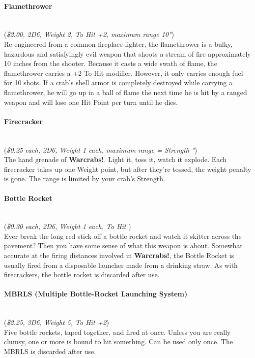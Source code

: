 \documentclass[a4paper,10pt]{article}
\newcommand{\warcrabs}{\textbf{Warcrabs!}}
\begin{document}
\paragraph*{Flamethrower}
\label{sec:Flamethrower}
\hspace*{0px}\\(\textit{\$2.00, 2D6, Weight 2, To Hit +2, maximum range 10"})\\
Re-engineered from a common fireplace lighter, the flamethrower is a bulky, hazardous and satisfyingly evil weapon that shoots a stream of fire approximately 10 inches from the shooter. Because it casts a wide swath of flame, the flamethrower carries a +2 To Hit modifier. However, it only carries enough fuel for 10 shots. If a crab's shell armor is completely destroyed while carrying a flamethrower, he will go up in a ball of flame the next time he is hit by a ranged weapon and will lose one Hit Point per turn until he dies.

\paragraph*{Firecracker}
\label{sec:Firecracker}
\hspace*{0px}\\(\textit{\$0.25 each, 2D6, Weight 1 each, maximum range = Strength "})\\
The hand grenade of \warcrabs. Light it, toss it, watch it explode. Each firecracker takes up one Weight point, but after they're tossed, the weight penalty is gone. The range is limited by your crab's Strength.

\paragraph*{Bottle Rocket}
\label{sec:BottleRocket}
\hspace*{0px}\\(\textit{\$0.30 each, 2D6, Weight 1 each, To Hit })\\
Ever break the long red stick off a bottle rocket and watch it skitter across the pavement? Then you have some sense of what this weapon is about. Somewhat accurate at the firing distances involved in \warcrabs, the Bottle Rocket is usually fired from a disposable launcher made from a drinking straw. As with firecrackers, the bottle rocket is discarded after use.

\paragraph*{MBRLS (Multiple Bottle-Rocket Launching System)}
\label{sec:MBRLS}
\hspace*{0px}\\(\textit{\$2.25, 3D6, Weight 5, To Hit +2})\\
Five bottle rockets, taped together, and fired at once. Unless you are really clumsy, one or more is bound to hit something. Can be used only once. The MBRLS is discarded after use.
\end{document}
